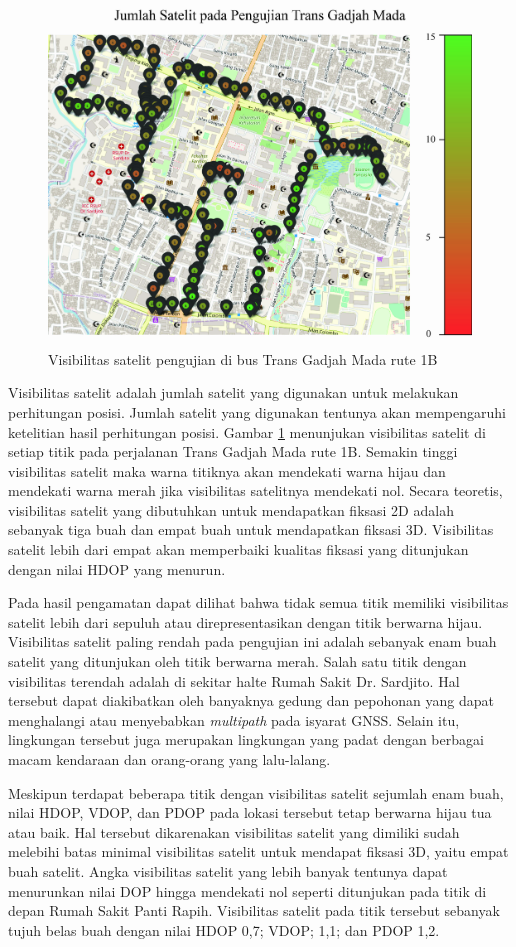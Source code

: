 \begin{figure}[H]
	\centering
	\includegraphics[width=12cm]{contents/chapter-4/pengujian-bergerak/moving-SATS.jpg}
	\caption{Visibilitas satelit pengujian di bus Trans Gadjah Mada rute 1B}
	\label{Fig: moving-sats}
\end{figure}

Visibilitas satelit adalah jumlah satelit yang digunakan untuk melakukan perhitungan posisi. Jumlah satelit yang digunakan tentunya akan mempengaruhi ketelitian hasil perhitungan posisi. Gambar \ref{Fig: moving-sats} menunjukan visibilitas satelit di setiap titik pada perjalanan Trans Gadjah Mada rute 1B. Semakin tinggi visibilitas satelit maka warna titiknya akan mendekati warna hijau dan mendekati warna merah jika visibilitas satelitnya mendekati nol. Secara teoretis, visibilitas satelit yang dibutuhkan untuk mendapatkan fiksasi 2D adalah sebanyak tiga buah dan empat buah untuk mendapatkan fiksasi 3D. Visibilitas satelit lebih dari empat akan memperbaiki kualitas fiksasi yang ditunjukan dengan nilai HDOP yang menurun. 

Pada hasil pengamatan dapat dilihat bahwa tidak semua titik memiliki visibilitas satelit lebih dari sepuluh atau direpresentasikan dengan titik berwarna hijau. Visibilitas satelit paling rendah pada pengujian ini adalah sebanyak enam buah satelit yang ditunjukan oleh titik berwarna merah. Salah satu titik dengan visibilitas terendah adalah di sekitar halte Rumah Sakit Dr. Sardjito. Hal tersebut dapat diakibatkan oleh banyaknya gedung dan pepohonan yang dapat menghalangi atau menyebabkan \textit{multipath} pada isyarat GNSS. Selain itu, lingkungan tersebut juga merupakan lingkungan yang padat dengan berbagai macam kendaraan dan orang-orang yang lalu-lalang.

Meskipun terdapat beberapa titik dengan visibilitas satelit sejumlah enam buah, nilai HDOP, VDOP, dan PDOP pada lokasi tersebut tetap berwarna hijau tua atau baik. Hal tersebut dikarenakan visibilitas satelit yang dimiliki sudah melebihi batas minimal visibilitas satelit untuk mendapat fiksasi 3D, yaitu empat buah satelit. Angka visibilitas satelit yang lebih banyak tentunya dapat menurunkan nilai DOP hingga mendekati nol seperti ditunjukan pada titik di depan Rumah Sakit Panti Rapih. Visibilitas satelit pada titik tersebut sebanyak tujuh belas buah dengan nilai HDOP 0,7; VDOP; 1,1; dan PDOP 1,2.
